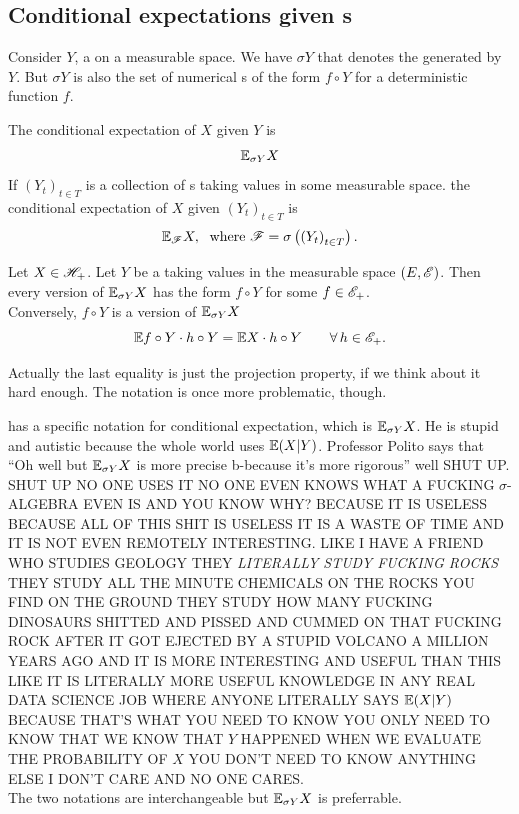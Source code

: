 \documentclass{report}
\begin{document}
\subsection{Conditional expectations given \rv s}
Consider $Y$, a \rv{} on a measurable space. We have $\sigma Y$ that denotes the \sa{} generated by $Y$. But $\sigma Y$ is also the set of numerical \rv s of the form $f\circ Y$ for a deterministic function $f$. 
\begin{definition}
	The conditional expectation of $X$ given $Y$ is
\[\mathbb{E}_{\sigma Y} X\]
If ${(Y_{t})}_{t\in T}$ is a collection of \rv s taking values in some measurable space. the conditional expectation of $X$ given ${(Y_{t})}_{t\in T}$ is
\[\mathbb{E}_{\mathscr{F}} X,\;\text{ where }\mathscr{F}=\sigma\left({(Y_{t})}_{t\in T}\right).\]
\end{definition}
\begin{theorem}
	Let $X\in\mathscr{H}_+$. Let $Y$ be a \rv{} taking values in the measurable space $(E,\mathscr{E})$. Then every version of $\mathbb{E}_{\sigma Y} X$ has the form $f\circ Y$ for some $f\in\mathscr{E}_+$.\\
	Conversely, $f\circ Y$ is a version of $\mathbb{E}_{\sigma Y}X$ \ifonly{} 
	\[\mathbb{E} f\circ Y\cdot h\circ Y=\mathbb{E} X\cdot h\circ Y\qquad\forall\, h\in\mathscr{E}_+.\]
\end{theorem}
Actually the last equality is just the projection property, if we think about it hard enough. The notation is once more problematic, though.
\begin{notation}
	\cinlar has a specific notation for conditional expectation, which is $\mathbb{E}_{\sigma Y}X$. He is stupid and autistic because the whole world uses $\mathbb{E}(X|Y)$. Professor Polito says that ``Oh well but $\mathbb{E}_{\sigma Y}X$ is more precise b-because it's more rigorous'' well SHUT UP. SHUT UP NO ONE USES IT NO ONE EVEN KNOWS WHAT A FUCKING $\sigma$-ALGEBRA EVEN IS AND YOU KNOW WHY? BECAUSE IT IS USELESS BECAUSE ALL OF THIS SHIT IS USELESS IT IS A WASTE OF TIME AND IT IS NOT EVEN REMOTELY INTERESTING. LIKE I HAVE A FRIEND WHO STUDIES GEOLOGY THEY \textit{LITERALLY STUDY FUCKING ROCKS} THEY STUDY ALL THE MINUTE CHEMICALS ON THE ROCKS YOU FIND ON THE GROUND THEY STUDY HOW MANY FUCKING DINOSAURS SHITTED AND PISSED AND CUMMED ON THAT FUCKING ROCK AFTER IT GOT EJECTED BY A STUPID VOLCANO A MILLION YEARS AGO AND IT IS MORE INTERESTING AND USEFUL THAN THIS LIKE IT IS LITERALLY MORE USEFUL KNOWLEDGE IN ANY REAL DATA SCIENCE JOB WHERE ANYONE LITERALLY SAYS $\mathbb{E}(X|Y)$ BECAUSE THAT'S WHAT YOU NEED TO KNOW YOU ONLY NEED TO KNOW THAT WE KNOW THAT $Y$ HAPPENED WHEN WE EVALUATE THE PROBABILITY OF $X$ YOU DON'T NEED TO KNOW ANYTHING ELSE I DON'T CARE AND NO ONE CARES.\\
	
	\vspace{0.05cm}The two notations are interchangeable but $\mathbb{E}_{\sigma Y}X$ is preferrable.
\end{notation}
\end{document}
